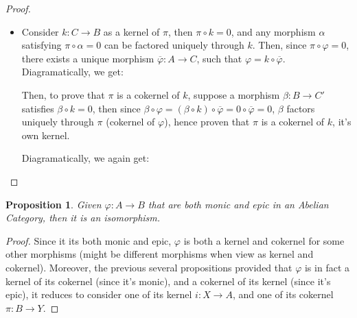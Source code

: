 \documentclass[x11names,reqno,12pt]{extarticle}
\newtheorem{prop}{Proposition}
\begin{document}
\begin{proof}
\begin{itemize}
        \item Consider $k:C\rightarrow B$ as a kernel of $\pi$, then $\pi\circ k=0$, and any morphism $\alpha$ satisfying $\pi\circ\alpha=0$ can be factored uniquely through $k$. Then, since $\pi\circ\varphi = 0$, there exists a unique morphism $\overline{\varphi}:A\rightarrow C$, such that $\varphi=k\circ \overline{\varphi}$. Diagramatically, we get:
        \begin{center}
        \end{center}
        Then, to prove that $\pi$ is a cokernel of $k$, suppose a morphism $\beta:B\rightarrow C'$ satisfies $\beta\circ k=0$, then since $\beta\circ\varphi = (\beta \circ k)\circ \overline{\varphi}=0\circ\overline{\varphi}=0$, $\beta$ factors uniquely through $\pi$ (cokernel of $\varphi$), hence proven that $\pi$ is a cokernel of $k$, it's own kernel.

        Diagramatically, we again get:
         \begin{center}
        \end{center}
    \end{itemize}
\end{proof}

\begin{prop}
    Given $\varphi:A\rightarrow B$ that are both monic and epic in an Abelian Category, then it is an isomorphism.
\end{prop}
\begin{proof}
    Since it its both monic and epic, $\varphi$ is both a kernel and cokernel for some other morphisms (might be different morphisms when view as kernel and cokernel). Moreover, the previous several propositions provided that $\varphi$ is in fact a kernel of its cokernel (since it's monic), and a cokernel of its kernel (since it's epic), it reduces to consider one of its kernel $i:X\rightarrow A$, and one of its cokernel $\pi:B\rightarrow Y$.

    
\end{proof}
\end{document}

